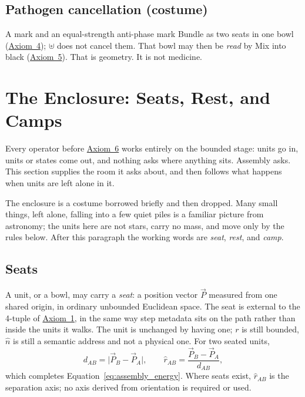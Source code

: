 \documentclass[12pt, a4paper]{article}
\begin{document}
\subsection{Pathogen cancellation (costume)}
A mark and an equal-strength anti-phase mark Bundle as two seats in
one bowl (\hyperref[subsec:axiom_idempotence]{Axiom~4}); $\uplus$ does not
cancel them. That bowl may then be \emph{read} by Mix into black
(\hyperref[subsec:axiom_interference]{Axiom~5}). That is geometry. It is not
medicine.

\section{The Enclosure: Seats, Rest, and Camps}
\label{sec:enclosure}

Every operator before \hyperref[subsec:axiom_assembly]{Axiom~6} works
entirely on the bounded stage: units go in, units or states come
out, and nothing asks where anything sits. Assembly asks. This
section supplies the room it asks about, and then follows what
happens when units are left alone in it.

The enclosure is a costume borrowed briefly and then dropped. Many
small things, left alone, falling into a few quiet piles is a
familiar picture from astronomy; the units here are not stars, carry
no mass, and move only by the rules below. After this paragraph the
working words are \emph{seat}, \emph{rest}, and \emph{camp}.

\subsection{Seats}
\label{subsec:enclosure_seats}
A unit, or a bowl, may carry a \emph{seat}: a position vector
$\vec P$ measured from one shared origin, in ordinary unbounded
Euclidean space. The seat is external to the 4-tuple of
\hyperref[subsec:axiom1]{Axiom~1}, in the same way step metadata sits on the
path rather than inside the units it walks. The unit is unchanged by
having one; $r$ is still bounded, $\hat n$ is still a semantic
address and not a physical one. For two seated units,
\begin{equation}
    d_{AB} = \lvert \vec P_B - \vec P_A\rvert,
    \qquad
    \hat r_{AB} = \frac{\vec P_B - \vec P_A}{d_{AB}},
    \label{eq:enclosure_distance}
\end{equation}
which completes Equation~\eqref{eq:assembly_energy}. Where seats
exist, $\hat r_{AB}$ is the separation axis; no axis derived from
orientation is required or used.
\end{document}

